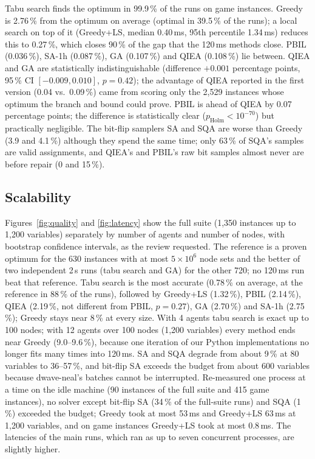 \documentclass[12pt, a4paper]{article}
\begin{document}
Tabu search finds the optimum in 99.9\,\% of the runs on game instances. Greedy is 2.76\,\% from the optimum on average (optimal in 39.5\,\% of the runs); a local search on top of it (Greedy+LS, median 0.40\,ms, 95th percentile 1.34\,ms) reduces this to 0.27\,\%, which closes 90\,\% of the gap that the 120\,ms methods close. PBIL (0.036\,\%), SA-1h (0.087\,\%), GA (0.107\,\%) and QIEA (0.108\,\%) lie between. QIEA and GA are statistically indistinguishable (difference $+0.001$ percentage points, 95\,\% CI $[-0.009, 0.010]$, $p=0.42$); the advantage of QIEA reported in the first version (0.04 vs.\ 0.09\,\%) came from scoring only the 2{,}529 instances whose optimum the branch and bound could prove. PBIL is ahead of QIEA by 0.07 percentage points; the difference is statistically clear ($p_{\text{Holm}}<10^{-70}$) but practically negligible. The bit-flip samplers SA and SQA are worse than Greedy (3.9 and 4.1\,\%) although they spend the same time; only 63\,\% of SQA's samples are valid assignments, and QIEA's and PBIL's raw bit samples almost never are before repair (0 and 15\,\%).

\subsection*{Scalability}

Figures~\ref{fig:quality} and \ref{fig:latency} show the full suite (1{,}350 instances up to 1{,}200 variables) separately by number of agents and number of nodes, with bootstrap confidence intervals, as the review requested. The reference is a proven optimum for the 630 instances with at most $5\times10^6$ node sets and the better of two independent 2\,s runs (tabu search and GA) for the other 720; no 120\,ms run beat that reference. Tabu search is the most accurate (0.78\,\% on average, at the reference in 88\,\% of the runs), followed by Greedy+LS (1.32\,\%), PBIL (2.14\,\%), QIEA (2.19\,\%, not different from PBIL, $p=0.27$), GA (2.70\,\%) and SA-1h (2.75\,\%); Greedy stays near 8\,\% at every size. With 4 agents tabu search is exact up to 100 nodes; with 12 agents over 100 nodes (1{,}200 variables) every method ends near Greedy (9.0--9.6\,\%), because one iteration of our Python implementations no longer fits many times into 120\,ms. SA and SQA degrade from about 9\,\% at 80 variables to 36--57\,\%, and bit-flip SA exceeds the budget from about 600 variables because dwave-neal's batches cannot be interrupted. Re-measured one process at a time on the idle machine (90 instances of the full suite and 415 game instances), no solver except bit-flip SA (34\,\% of the full-suite runs) and SQA (1\,\%) exceeded the budget; Greedy took at most 53\,ms and Greedy+LS 63\,ms at 1{,}200 variables, and on game instances Greedy+LS took at most 0.8\,ms. The latencies of the main runs, which ran as up to seven concurrent processes, are slightly higher.
\end{document}
